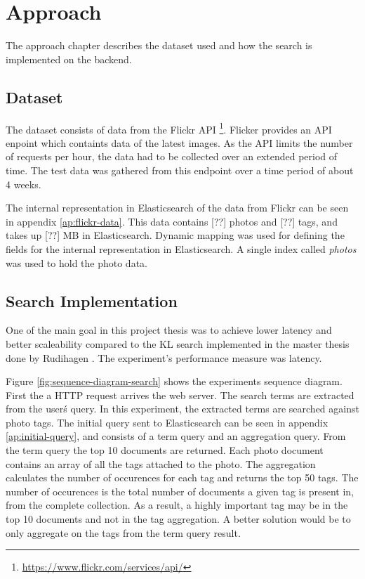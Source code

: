 \chapter{Approach}
\label{ch:approach}
The approach chapter describes the dataset used and how the search is implemented on the backend.

\section{Dataset}
The dataset consists of data from the Flickr API \footnote{\url{https://www.flickr.com/services/api/}}.
Flicker provides an API enpoint which containts data of the latest images.
As the API limits the number of requests per hour, the data had to be collected over an extended period of time.
The test data was gathered from this endpoint over a time period of about 4 weeks.

The internal representation in Elasticsearch of the data from Flickr can be seen in appendix \ref{ap:flickr-data}.
This data contains [??] photos and [??] tags, and takes up [??] MB in Elasticsearch.
Dynamic mapping was used for defining the fields for the internal representation in Elasticsearch.
A single index called \textit{photos} was used to hold the photo data.

\section{Search Implementation}
One of the main goal in this project thesis was to achieve lower latency and better scaleability compared to the KL search implemented in the master thesis done by Rudihagen \cite{master-thesis}.
The experiment's performance measure was latency.

Figure \ref{fig:sequence-diagram-search} shows the experiments sequence diagram.
First the a HTTP request arrives the web server.
The search terms are extracted from the user\'s query.
In this experiment, the extracted terms are searched against photo tags.
The initial query sent to Elasticsearch can be seen in appendix \ref{ap:initial-query},
and consists of a term query and an aggregation query.
From the term query the top 10 documents are returned.
Each photo document contains an array of all the tags attached to the photo.
The aggregation calculates the number of occurences for each tag and returns the top 50 tags.
The number of occurences is the total number of documents a given tag is present in, from the complete collection.
As a result, a highly important tag may be in the top 10 documents and not in the tag aggregation.
A better solution would be to only aggregate on the tags from the term query result.

